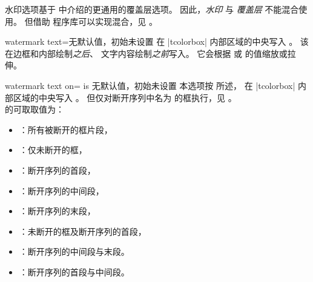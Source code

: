\begin{marker}
水印选项基于  中介绍的更通用的覆盖层选项。
因此，\emph{水印} 与 \emph{覆盖层} 不能混合使用。
但借助  程序库可以实现混合，见 。
\end{marker}


\begin{docTcbKey}{watermark text}{=}{无默认值，初始未设置}
  在 |tcolorbox| 内部区域的中央写入 。
  该  在边框和内部绘制\emph{之后}、
  文字内容绘制\emph{之前}写入。
  它会根据  或
   的值缩放或拉伸。
\begin{dispExample}

\begin{tcolorbox}[enhanced,title=My title,watermark text=My Watermark]
\lipsum[1]
\tcblower
\lipsum[2]
\end{tcolorbox}
\end{dispExample}
\end{docTcbKey}

\enlargethispage*{1cm}

\begin{docTcbKey}{watermark text on}{= is }{无默认值，初始未设置}
  本选项按  所述，
  在 |tcolorbox| 内部区域的中央写入 。
  但仅对断开序列中名为  的框执行，见 。\\
   的可取取值为：
  \begin{itemize}
  \item{}：所有被断开的框片段，
  \item{}：仅未断开的框，
  \item{}：断开序列的首段，
  \item{}：断开序列的中间段，
  \item{}：断开序列的末段，
  \item{}：未断开的框及断开序列的首段，
  \item{}：断开序列的中间段与末段。
  \item{}：断开序列的首段与中间段。
  \end{itemize}
\end{docTcbKey}


\clearpage


